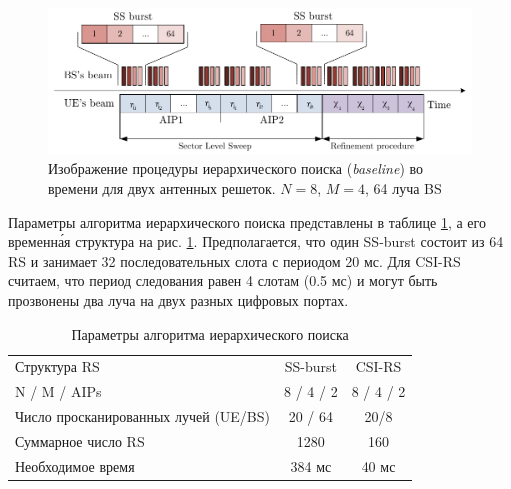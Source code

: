 \begin{figure}[ht]
    \centering
    \includegraphics[width=\linewidth]{figs/fig4.9}
    \caption{Изображение процедуры иерархического поиска (\textit{baseline}) во времени для двух антенных решеток. $N=8$, $M=4$, 64 луча BS}
    \label{fig:4.10}
\end{figure}

Параметры алгоритма иерархического поиска представлены в таблице \ref{tab:4.2}, а его временн\'{а}я
структура на рис. \ref{fig:4.10}.
Предполагается, что один SS-burst состоит из 64 RS и занимает 32 последовательных слота с периодом 20 мс.
Для CSI-RS считаем, что период следования равен 4 слотам (0.5 мс) и могут быть
прозвонены два луча на двух разных цифровых портах.

\begin{table}
    \centering
    \caption{Параметры алгоритма иерархического поиска}
    \label{tab:4.2}
    \begin{tabular}{lcc}
        \toprule
        \midrule
        Структура RS                         & SS-burst  & CSI-RS    \\
        N / M / AIPs                         & 8 / 4 / 2 & 8 / 4 / 2 \\
        Число просканированных лучей (UE/BS) & 20 / 64   & 20/8      \\
        Суммарное число RS                   & 1280      & 160       \\
        Необходимое время                    & 384 мс    & 40 мс     \\
        \bottomrule
    \end{tabular}
\end{table}




